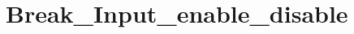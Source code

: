 \hypertarget{group___break___input__enable__disable}{\section{Break\-\_\-\-Input\-\_\-enable\-\_\-disable}
\label{group___break___input__enable__disable}
}
